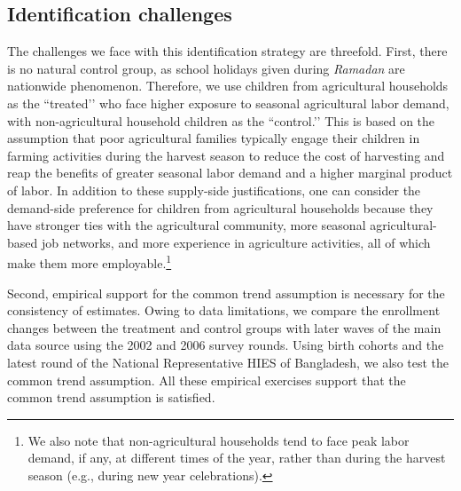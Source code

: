 \documentclass[12pt,letterpaper]{article}
\newcommand{\0}{\ensuremath{\mbox{\boldmath $0$}}}
\begin{document}
\subsection{Identification challenges \label{sec.identification_challange}}

The challenges we face with this identification strategy are threefold. First, there is no natural control group, as school holidays given during \textit{Ramadan} are nationwide phenomenon. Therefore, we use children from agricultural households as the ``treated’’ who face higher exposure to seasonal agricultural labor demand, with non-agricultural household children as the ``control.’’ This is based on the assumption that poor agricultural families typically engage their children in farming activities during the harvest season to reduce the cost of harvesting and reap the benefits of greater seasonal labor demand and a higher marginal product of labor. In addition to these supply-side justifications, one can consider the demand-side preference for children from agricultural households because they have stronger ties with the agricultural community, more seasonal agricultural-based job networks, and more experience in agriculture activities, all of which make them more employable.\footnote{We also note that non-agricultural households tend to face peak labor demand, if any, at different times of the year, rather than during the harvest season (e.g., during new year celebrations).}

Second, empirical support for the common trend assumption is necessary for the consistency of estimates. Owing to data limitations, we compare the enrollment changes between the treatment and control groups with later waves of the main data source using the 2002 and 2006 survey rounds. Using birth cohorts and the latest round of the National Representative HIES of Bangladesh, we also test the common trend assumption. All these empirical exercises support that the common trend assumption is satisfied.  
 
\end{document}
